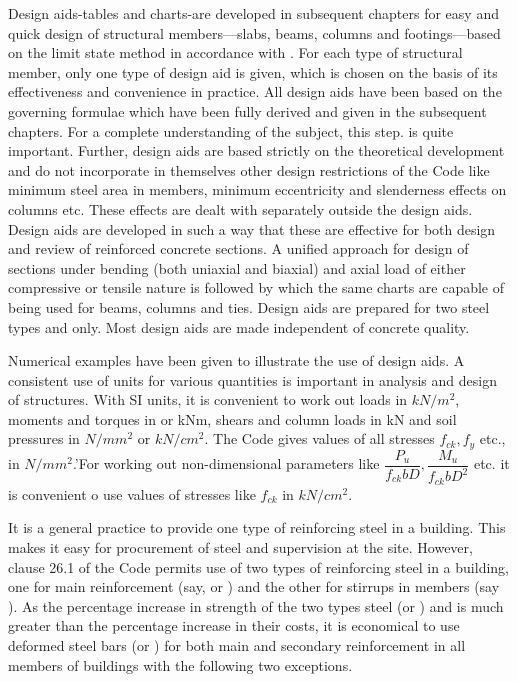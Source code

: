 Design aids-tables and charts-are developed in subsequent  chapters for
easy and quick design of structural members—slabs, beams, columns and footings—based
on the limit state method in accordance with . For each type of structural member, only
one type of design aid is given, which is chosen on the basis of its
effectiveness and convenience in practice. All design aids have been 
based on the governing formulae which have been fully derived and given
in the subsequent chapters. For a complete understanding of the subject,
this step. is quite important. Further, design aids are based strictly
on the theoretical development and do not incorporate in themselves other
design restrictions of the Code like minimum steel area in members, minimum
eccentricity and slenderness effects on columns etc. These effects are
dealt with separately outside the design aids. Design aids are developed
in such a way that these are effective for both design and review of
reinforced concrete sections. A unified approach for design of sections
under bending (both uniaxial and biaxial) and axial load of either
compressive or tensile nature is followed by which the same charts are
capable of being used for beams, columns and ties. Design aids are
prepared for two steel types {\fetwofivezero}  and {\fefouronefive} only.
Most design aids are made independent of concrete quality.

Numerical examples have been given to illustrate the use of design aids.
A consistent use of units for various quantities is important in analysis
and design of structures. With SI units, it is convenient to work out
loads in $kN/m^2$, moments and torques in or kNm, shears and column
loads in kN and soil pressures in $N/mm^2$ or $kN/cm^2$. The Code
gives values of all stresses $f_{ck}, f_y$ etc., in $N/mm^2$.'For working
out non-dimensional parameters like
$\dfrac{P_u}{f_{ck}bD},\dfrac{M_u}{f_{ck}bD^2}$ etc. it is convenient o
use  values of stresses like $f_{ck}$ in $kN/cm^2$.


It is a general practice to provide one type of reinforcing steel in a
building. This makes it easy for procurement of steel and supervision 
at the site. However, clause 26.1 of the Code permits use of two types
of reinforcing steel in a building, one for main reinforcement (say,
{\fefouronefive} or {\fefivezerozero}) and the other for stirrups in members
(say {\fetwofivezero}).
As the percentage increase in strength of the two types steel
\fefouronefive
(or {\fefivezerozero}) and {\fetwofivezero} is much greater than the percentage increase in
their costs, it is economical to use deformed steel bars
{\fefouronefive} (or \fefivezerozero) for both main and secondary
reinforcement in all members of buildings with the following two exceptions.

